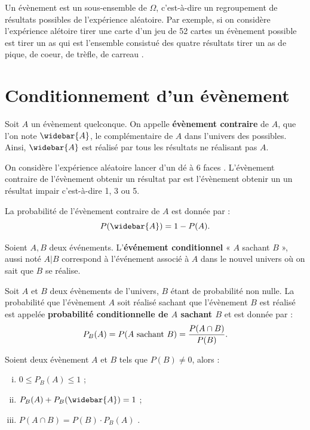 \documentclass[a4paper, 12pt]{report}
\begin{document}
Un évènement est un sous-ensemble de $\Omega$, c'est-à-dire un \og regroupement \fg{} de résultats possibles de l'expérience aléatoire.
Par exemple, si on considère l'expérience alétoire \og tirer une carte d'un jeu de 52 cartes \fg{} un évènement possible est \og tirer un as 
\fg{} qui est l'ensemble consistué des quatre résultats \og tirer un as de pique, de coeur, de trèfle, de carreau \fg.

\section{Conditionnement d'un évènement}

\begin{defn}
Soit $A$ un évènement quelconque. On appelle \textbf{évènement contraire} de $A$, que l'on note $\widebar{A}$, 
le complémentaire de $A$ dans l'univers des possibles. Ainsi, $\widebar{A}$ est réalisé par tous les résultats ne réalisant pas $A$. 
\end{defn}

\begin{ex}
On considère l'expérience aléatoire \og lancer d'un dé à 6 faces \fg. L'évènement contraire de l'évènement \og obtenir un résultat par \fg{} est l'évènement \og obtenir un un résultat impair \fg{} c'est-à-dire 1, 3 ou 5.
\end{ex}

\begin{prop}
La probabilité de l'évènement contraire de $A$ est donnée par :
\[ P(\widebar{A}) = 1 - P(A) . \]
\end{prop}

\begin{defn}
Soient $A, B$ deux événements. L'\textbf{événement conditionnel} « $A$ sachant $B$ », aussi noté $A|B$
	correspond à l'événement associé à $A$ dans le nouvel univers où on sait que $B$ se réalise.
\end{defn}

\begin{defn}
	Soit $A$ et $B$ deux évènements de l'univers, $B$ étant de probabilité non nulle. La probabilité que l'évènement $A$ soit réalisé
	sachant que l'évènement $B$ est réalisé est appelée \textbf{probabilité conditionnelle de $A$ sachant $B$} et est donnée par :
		\[ P_B(A) = P(A \text{ sachant } B) = \dfrac{P(A \cap B)}{P(B)}. \]
\end{defn}

\begin{prop}[élémentaires]
Soient deux évènement $A$ et $B$ tels que $P(B) \neq 0$, alors :
\begin{enumerate}[(i)]
\item $0 \leq P_B(A) \leq 1$ ;
\item $P_B(A) + P_B(\widebar{A}) = 1$ ;
\item $P(A \cap B) = P(B) \cdot P_B(A)$ .
\end{enumerate}
\end{prop}
\end{document}
